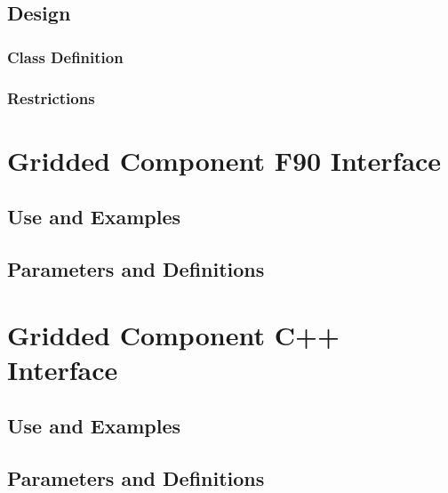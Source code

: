 \documentclass[]{article}
\begin{document}
\subsection{Design}




\subsubsection{Class Definition}




\subsubsection{Restrictions}




\section{Gridded Component F90 Interface}

\subsection{Use and Examples}




\subsection{Parameters and Definitions}








\section{Gridded Component C++ Interface}

\subsection{Use and Examples}




\subsection{Parameters and Definitions}
\end{document}
